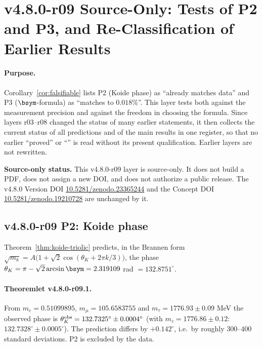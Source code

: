 
\clearpage
\section*{v4.8.0-r09 Source-Only: Tests of P2 and P3, and Re-Classification of Earlier Results}
\label{sec:v480-r09-p2-p3-reclassification}

\paragraph{Purpose.}
Corollary~\ref{cor:falsifiable} lists P2 (Koide phase) as ``already matches data'' and P3
(\(\bsym\)-formula) as ``matches to \(0.018\%\)''.  This layer tests both against the measurement
precision and against the freedom in choosing the formula.  Since layers r03--r08 changed the status
of many earlier statements, it then collects the current status of all predictions and of the main
results in one register, so that no earlier ``proved'' or ``\checkmark'' is read without its
present qualification.  Earlier layers are not rewritten.

\noindent\textbf{Source-only status.}
This v4.8.0-r09 layer is source-only.  It does not build a PDF, does not assign a new DOI,
and does not authorize a public release.  The v4.8.0 Version DOI
\href{https://doi.org/10.5281/zenodo.23365244}{10.5281/zenodo.23365244} and the Concept DOI
\href{https://doi.org/10.5281/zenodo.19210728}{10.5281/zenodo.19210728} are unchanged by it.

\subsection*{v4.8.0-r09 P2: Koide phase}
\label{subsec:v480-r09-p2}

Theorem~\ref{thm:koide-triolic} predicts, in the Brannen form
\(\sqrt{m_k}=A\bigl(1+\sqrt2\cos(\theta_K+2\pi k/3)\bigr)\), the phase
\(\theta_K=\pi-\sqrt2\arcsin\bsym=2.319109\) rad \(=132.8751^\circ\).

\paragraph{Theoremlet v4.8.0-r09.1.}
From \(m_e=0.51099895\), \(m_\mu=105.6583755\) and \(m_\tau=1776.93\pm0.09\) MeV the observed phase is
\(\theta_K^{\rm obs}=132.7325^\circ\pm0.0004^\circ\) (with \(m_\tau=1776.86\pm0.12\):
\(132.7328^\circ\pm0.0005^\circ\)).  The prediction differs by \(+0.142^\circ\), i.e.\ by roughly
\(300\)--\(400\) standard deviations.  P2 is excluded by the data.

